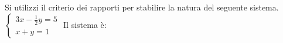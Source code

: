 Si utilizzi il criterio dei rapporti per stabilire la natura del seguente sistema.
 $\left\{\begin{matrix}3x-\frac 1 2y=5\\x+y=1\end{matrix}\right.$ 
Il sistema è: 
